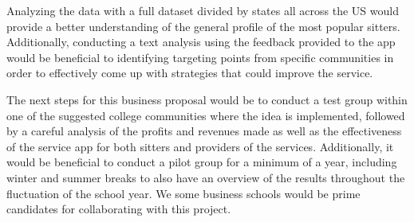 \documentclass[12pt]{article}
\begin{document}
Analyzing the data with a full dataset divided by states all across the
US would provide a better understanding of the general profile of the
most popular sitters. Additionally, conducting a text analysis using the
feedback provided to the app would be beneficial to identifying
targeting points from specific communities in order to effectively come
up with strategies that could improve the service.~

The next steps for this business proposal would be to conduct a test
group within one of the suggested college communities where the idea is
implemented, followed by a careful analysis of the profits and revenues
made as well as the effectiveness of the service app for both sitters
and providers of the services. Additionally, it would be beneficial to
conduct a pilot group for a minimum of a year, including winter and
summer breaks to also have an overview of the results throughout the
fluctuation of the school year. We some business schools would be prime
candidates for collaborating with this project.



\end{document}
